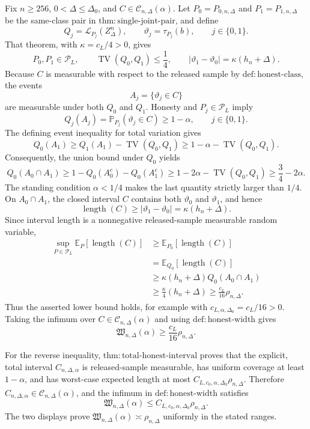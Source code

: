 Fix \(n\geq256\), \(0<\Delta\leq\Delta_0\), and \(C\in\mathcal C_{n,\Delta}(\alpha)\).  Let \(P_0=P_{0,n,\Delta}\) and \(P_1=P_{1,n,\Delta}\) be the same-class pair in \(\mathrm{thm:single\text{-}joint\text{-}pair}\), and define
\[
 Q_j=\mathcal L_{P_j}(Z_\Delta^n),
 \qquad \vartheta_j=\tau_{P_j}(b),
 \qquad j\in\{0,1\}.
\]
That theorem, with \(\kappa=c_L/4>0\), gives
\[
 P_0,P_1\in\mathcal P_L,
 \qquad \operatorname{TV}(Q_0,Q_1)\leq\frac14,
 \qquad |\vartheta_1-\vartheta_0|=\kappa(h_n+\Delta).
\]
Because \(C\) is measurable with respect to the released sample by \(\mathrm{def:honest\text{-}class}\), the events
\[
 A_j=\{\vartheta_j\in C\}
\]
are measurable under both \(Q_0\) and \(Q_1\).  Honesty and \(P_j\in\mathcal P_L\) imply
\[
 Q_j(A_j)=\mathbb P_{P_j}(\vartheta_j\in C)\geq1-\alpha,
 \qquad j\in\{0,1\}.
\]
The defining event inequality for total variation gives
\[
 Q_0(A_1)\geq Q_1(A_1)-\operatorname{TV}(Q_0,Q_1)
 \geq1-\alpha-\operatorname{TV}(Q_0,Q_1).
\]
Consequently, the union bound under \(Q_0\) yields
\[
 Q_0(A_0\cap A_1)
 \geq1-Q_0(A_0^c)-Q_0(A_1^c)
 \geq1-2\alpha-\operatorname{TV}(Q_0,Q_1)
 \geq\frac34-2\alpha.
\]
The standing condition \(\alpha<1/4\) makes the last quantity strictly larger than \(1/4\).  On \(A_0\cap A_1\), the closed interval \(C\) contains both \(\vartheta_0\) and \(\vartheta_1\), and hence
\[
 \operatorname{length}(C)\geq|\vartheta_1-\vartheta_0|
 =\kappa(h_n+\Delta).
\]
Since interval length is a nonnegative released-sample measurable random variable,
\[
 \begin{aligned}
 \sup_{P\in\mathcal P_L}\mathbb E_P[\operatorname{length}(C)]
 &\geq\mathbb E_{P_0}[\operatorname{length}(C)]\\
 &=\mathbb E_{Q_0}[\operatorname{length}(C)]\\
 &\geq\kappa(h_n+\Delta)Q_0(A_0\cap A_1)\\
 &\geq\frac\kappa4(h_n+\Delta)
 \geq\frac{c_L}{16}\rho_{n,\Delta}.
 \end{aligned}
\]
Thus the asserted lower bound holds, for example with \(c_{L,\alpha,\Delta_0}=c_L/16>0\).  Taking the infimum over \(C\in\mathcal C_{n,\Delta}(\alpha)\) and using \(\mathrm{def:honest\text{-}width}\) gives
\[
 \mathfrak W_{n,\Delta}(\alpha)\geq\frac{c_L}{16}\rho_{n,\Delta}.
\]

For the reverse inequality, \(\mathrm{thm:total\text{-}honest\text{-}interval}\) proves that the explicit, total interval \(C_{n,\Delta,\alpha}\) is released-sample measurable, has uniform coverage at least \(1-\alpha\), and has worst-case expected length at most \(C_{L,c_0,\alpha,\Delta_0}\rho_{n,\Delta}\).  Therefore \(C_{n,\Delta,\alpha}\in\mathcal C_{n,\Delta}(\alpha)\), and the infimum in \(\mathrm{def:honest\text{-}width}\) satisfies
\[
 \mathfrak W_{n,\Delta}(\alpha)
 \leq C_{L,c_0,\alpha,\Delta_0}\rho_{n,\Delta}.
\]
The two displays prove \(\mathfrak W_{n,\Delta}(\alpha)\asymp\rho_{n,\Delta}\) uniformly in the stated ranges.